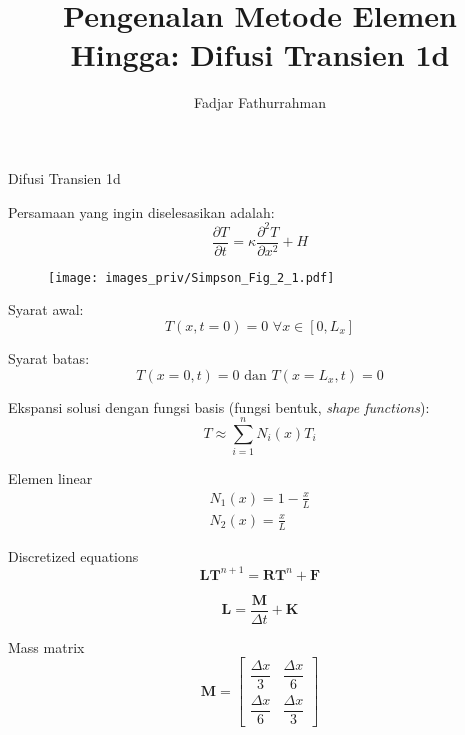 



\title{Pengenalan Metode Elemen Hingga: Difusi Transien 1d}
\author{Fadjar Fathurrahman}
\date{}
\maketitle

Difusi Transien 1d

Persamaan yang ingin diselesasikan adalah:
\begin{equation*}
\frac{\partial T}{\partial t} = \kappa \frac{\partial^2 T}{\partial x^2} + H
\end{equation*}

\begin{figure}[h]
{\centering
\texttt{[image: images\_priv/Simpson\_Fig\_2\_1.pdf]}
\par}
\end{figure}

Syarat awal:
\begin{equation*}
T(x,t=0) = 0 \,\, \forall x \in [0,L_{x}]
\end{equation*}

Syarat batas:
\begin{equation*}
T(x=0,t) = 0 \,\, \text{dan} \,\, T(x=L_{x},t) = 0
\end{equation*}


Ekspansi solusi dengan fungsi basis (fungsi bentuk, \textit{shape functions}):
\begin{equation*}
T \approx \sum_{i=1}^{n} N_{i}(x) T_{i}
\end{equation*}

Elemen linear
\begin{align*}
N_{1}(x) = 1 - \frac{x}{L} \\
N_{2}(x) = \frac{x}{L}
\end{align*}

Discretized equations
\begin{equation*}
\mathbf{L} \mathbf{T}^{n+1} = \mathbf{R} \mathbf{T}^{n} + \mathbf{F}
\end{equation*}

\begin{equation*}
\mathbf{L} = \frac{\mathbf{M}}{\Delta t} + \mathbf{K}
\end{equation*}

Mass matrix
\begin{equation*}
\mathbf{M} = \begin{bmatrix}
\dfrac{\Delta x}{3} & \dfrac{\Delta x}{6} \\
\dfrac{\Delta x}{6} & \dfrac{\Delta x}{3}
\end{bmatrix}
\end{equation*}

